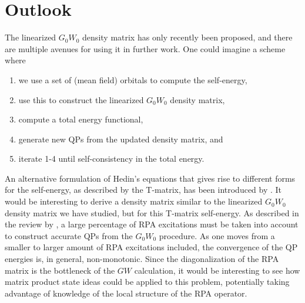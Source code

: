 \documentclass[12pt]{caltech_thesis}
\begin{document}
\chapter{Outlook}
The linearized $G_0W_0$ density matrix has only recently been proposed, and there are multiple avenues for using it in further work. One could imagine a scheme where
\begin{enumerate}
    \item we use a set of (mean field) orbitals to compute the self-energy,
    \item use this to construct the linearized $G_0W_0$ density matrix,
    \item compute a total energy functional,
    \item generate new QPs from the updated density matrix, and
    \item iterate 1-4 until self-consistency in the total energy.
\end{enumerate}
 An alternative formulation of Hedin's equations that gives rise to different forms for the self-energy, as described by the T-matrix, has been introduced by \textcite{Orlando_2023}. It would be interesting to derive a density matrix similar to the linearized $G_0W_0$ density matrix we have studied, but for this T-matrix self-energy. As described in the review by \textcite{marie_gw_2024}, a large percentage of RPA excitations must be taken into account to construct accurate QPs from the $G_0W_0$ procedure. As one moves from a smaller to larger amount of RPA excitations included, the convergence of the QP energies is, in general, non-monotonic. Since the diagonalization of the RPA matrix is the bottleneck of the $GW$ calculation, it would be interesting to see how matrix product state ideas could be applied to this problem, potentially taking advantage of knowledge of the local structure of the RPA operator. 

\printbibliography[heading=bibintoc]

\appendix
\end{document}
